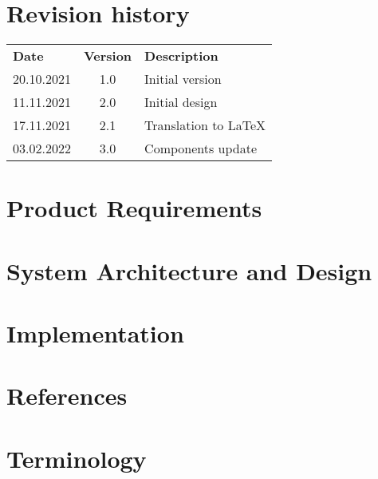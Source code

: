 \documentclass[hidelinks]{report}
\begin{document}
	\maketitle

	\chapter*{Revision history}

	\begin{table}[H]
		\centering
		\begin{tabularx}{\textwidth}{ l c X }
			\rowcolor[HTML]{C0C0C0}
			\textbf{Date} & \textbf{Version} & \textbf{Description} \\
			20.10.2021 & 1.0 & Initial version \\
			\rowcolor[HTML]{E7E7E7}
			11.11.2021 & 2.0 & Initial design \\
			17.11.2021 & 2.1 & Translation to LaTeX \\
			\rowcolor[HTML]{E7E7E7}
			03.02.2022 & 3.0 & Components update \\
		\end{tabularx}
	\end{table}

	\tableofcontents

	\chapter{Product Requirements}\label{chp:requirements}
	\thispagestyle{fancy}
	

	\chapter{System Architecture and Design}\label{chp:design}
	\thispagestyle{fancy}
	

	\chapter{Implementation}\label{chp:implementation}
	\thispagestyle{fancy}
	

	\chapter{References}\label{chp:references}
	\thispagestyle{fancy}
	

	\chapter{Terminology}\label{chp:terminology}
	\thispagestyle{fancy}
	
\end{document}
